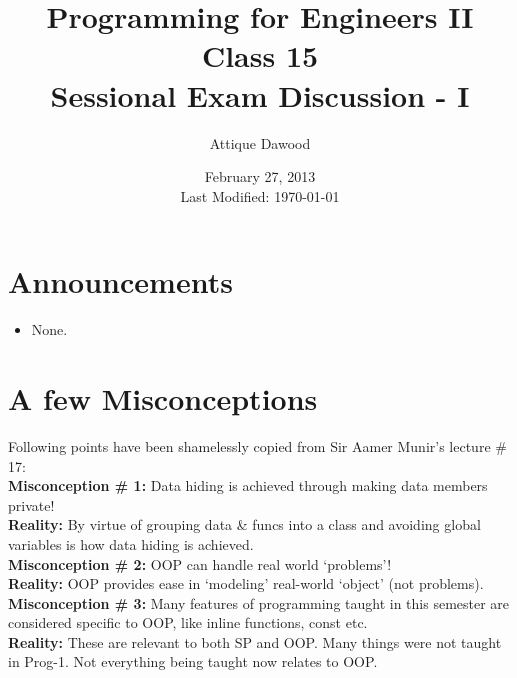 \documentclass[12pt,a4paper]{article}
\title{\vspace{-2cm}Programming for Engineers II\\Class 15\\Sessional Exam Discussion - I}
\author{Attique Dawood}
\date{February 27, 2013\\[0.2cm] Last Modified: \today}
\begin{document}
\maketitle
\section{Announcements}
\begin{itemize}
\item None.
\end{itemize}
\section{A few Misconceptions}
Following points have been shamelessly copied from Sir Aamer Munir's lecture \# 17:\\
\noindent\textbf{Misconception \# 1:} Data hiding is achieved through making data members private!\\
\noindent\textbf{Reality:} By virtue of grouping data \& funcs into a class and avoiding global variables is how data hiding is achieved.\\
\noindent\textbf{Misconception \# 2:} OOP can handle real world ‘problems’!\\
\noindent\textbf{Reality:} OOP provides ease in ‘modeling’ real-world ‘object’ (not problems).\\
\noindent\textbf{Misconception \# 3:} Many features of programming taught in this semester are considered specific to OOP, like inline functions, const etc.\\
\noindent\textbf{Reality:} These are relevant to both SP and OOP. Many things were not taught in Prog-1. Not everything being taught now relates to OOP.\\


\end{document}
